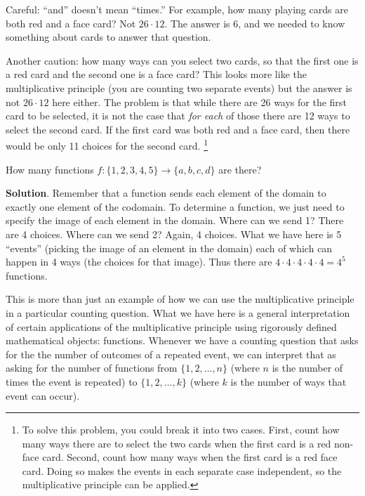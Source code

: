\documentclass[11pt,]{book}
\theoremstyle{ptxplainnotitle}
\theoremstyle{ptxplaintitle}
\theoremstyle{ptxdefinitionnotitle}
\theoremstyle{ptxdefinitiontitle}
\theoremstyle{ptxdefinitionnotitle}
\theoremstyle{ptxdefinitiontitle}
\theoremstyle{ptxdefinitionnotitle}
\theoremstyle{ptxdefinitiontitle}
\theoremstyle{ptxdefinitiontitlenonumber}
\theoremstyle{ptxdefinitiontitlenonumber}
\numberwithin{equation}{chapter}
\begin{document}
\hypertarget{p-1051}{}%
Careful: ``and'' doesn't mean ``times.'' For example, how many playing cards are both red and a face card? Not \(26 \cdot 12\). The answer is 6, and we needed to know something about cards to answer that question.%
\par
\hypertarget{p-1052}{}%
Another caution: how many ways can you select two cards, so that the first one is a red card and the second one is a face card? This looks more like the multiplicative principle (you are counting two separate events) but the answer is not \(26 \cdot 12\) here either. The problem is that while there are 26 ways for the first card to be selected, it is not the case that \emph{for each} of those there are 12 ways to select the second card. If the first card was both red and a face card, then there would be only 11 choices for the second card. \footnote{To solve this problem, you could break it into two cases. First, count how many ways there are to select the two cards when the first card is a red non-face card. Second, count how many ways when the first card is a red face card. Doing so makes the events in each separate case independent, so the multiplicative principle can be applied.\label{fn-5}}%
\begin{example}\label{example-counting-functions-all}
\hypertarget{p-1053}{}%
How many functions \(f:\{1,2,3,4,5\} \to \{a,b,c,d\}\) are there?%
\par\smallskip%
\noindent\textbf{Solution}.\hypertarget{solution-147}{}\quad%
\hypertarget{p-1054}{}%
Remember that a function sends each element of the domain to exactly one element of the codomain.  To determine a function, we just need to specify the image of each element in the domain.  Where can we send 1?  There are 4 choices.  Where can we send 2?  Again, 4 choices.  What we have here is 5 ``events'' (picking the image of an element in the domain) each of which can happen in 4 ways (the choices for that image).  Thus there are \(4 \cdot 4 \cdot 4 \cdot 4 \cdot 4 = 4^5\) functions.%
\par
\hypertarget{p-1055}{}%
This is more than just an example of how we can use the multiplicative principle in a particular counting question.  What we have here is a general interpretation of certain applications of the multiplicative principle using rigorously defined mathematical objects: functions.  Whenever we have a counting question that asks for the the number of outcomes of a repeated event, we can interpret that as asking for the number of functions from \(\{1,2,\ldots, n\}\) (where \(n\) is the number of times the event is repeated) to  \(\{1,2,\ldots,k\}\) (where \(k\) is the number of ways that event can occur).%
\end{example}
\typeout{************************************************}
\typeout{************************************************}
\end{document}

